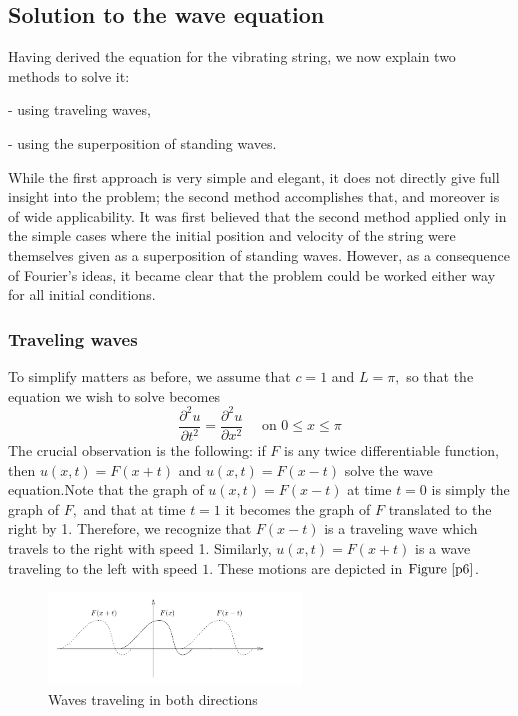 \documentclass[12pt]{book}
\theoremstyle{definition}\newtheorem{dfn}{Définition}[chapter]
\theoremstyle{plain}\newtheorem{thm}{Théorème}[chapter]
\theoremstyle{plain}\newtheorem{prp}{Proposition}[chapter]
\theoremstyle{plain}\newtheorem{lem}{\bf Lemme}[chapter]
\theoremstyle{plain}\newtheorem{axm}{\bf Axiome}[chapter]
\theoremstyle{plain}\newtheorem{lmm}{\bf Lemme}[chapter]
\theoremstyle{plain}\newtheorem{exm}{\bf Example}[chapter]
\theoremstyle{plain}\newtheorem{cor}{\bf Corollaire}[chapter]
\theoremstyle{remark}\newtheorem{rem}{Remarque}[chapter]
\newcommand{\reffig}[1]{\text{Figure}\ \ref{#1}}
\begin{document}
\subsection{Solution to the wave equation}
Having derived the equation for the vibrating string, we now explain two methods to solve it:

- using traveling waves,

- using the superposition of standing waves.

While the first approach is very simple and elegant, it does not directly give full insight into the problem; the second method accomplishes that, and moreover is of wide applicability. It was first believed that the second method applied only in the simple cases where the initial position and velocity of the string were themselves given as a superposition of standing waves. However, as a consequence of Fourier's ideas, it became clear that the problem could be worked either way for all initial conditions.

\subsubsection{Traveling waves}
To simplify matters as before, we assume that $c=1$ and $L=\pi,$ so that the equation we wish to solve becomes
$$
\frac{\partial^{2} u}{\partial t^{2}}=\frac{\partial^{2} u}{\partial x^{2}} \quad \text { on } 0 \leq x \leq \pi
$$
The crucial observation is the following: if $F$ is any twice differentiable function, then $u(x, t)=F(x+t)$ and $u(x, t)=F(x-t)$ solve the wave equation.Note that the graph of $u(x, t)=F(x-t)$ at time $t=0$ is simply the graph of $F,$ and that at time $t=1$ it becomes the graph of $F$ translated to the right by
1. Therefore, we recognize that $F(x-t)$ is a traveling wave which travels to the right with speed 1. Similarly, $u(x, t)=F(x+t)$ is a wave traveling to the left with speed $1 .$ These motions are depicted in $\reffig{p6}$.
\begin{figure}[H]\centering\includegraphics[width=0.6\textwidth]{image//The Genesis of Fourier Analysis//6}
	\caption{Waves traveling in both directions}
	\label{p6}	
\end{figure}
\end{document}
